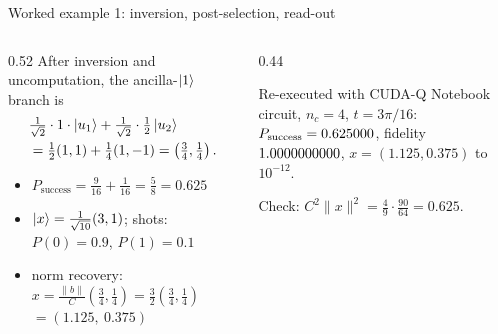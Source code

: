 \documentclass[aspectratio=169,11pt]{beamer}
\begin{document}
\begin{frame}{Worked example 1: inversion, post-selection, read-out}
  \begin{columns}[T]
    \begin{column}{0.52\textwidth}
      \small After inversion and uncomputation, the ancilla-$\ket1$ branch is
      \begin{align*}
        &\tfrac{1}{\sqrt2}\cdot1\cdot\ket{u_1} + \tfrac{1}{\sqrt2}\cdot\tfrac12\ket{u_2}\\
        &= \tfrac12(1, 1) + \tfrac14(1, -1) = \left(\tfrac34, \tfrac14\right).
      \end{align*}
      \begin{itemize}
        \item $P_{\text{success}} = \frac9{16} + \frac1{16} = \frac58 = 0.625$
        \item $\ket x = \frac{1}{\sqrt{10}}(3, 1)$; shots: $P(0) = 0.9$, $P(1) = 0.1$
        \item norm recovery: $x = \frac{\|b\|}{C}\left(\tfrac34, \tfrac14\right) = \tfrac32\left(\tfrac34, \tfrac14\right)$\\ $= (1.125,\ 0.375)$ \checkmark
      \end{itemize}
    \end{column}
    \begin{column}{0.44\textwidth}
      \begin{exampleblock}{Re-executed with CUDA-Q}
        Notebook circuit, $n_c = 4$, $t = 3\pi/16$:\\
        $P_{\text{success}} = 0.625000$, fidelity $1.0000000000$, $x = (1.125, 0.375)$ to $10^{-12}$.
      \end{exampleblock}
      \small Check: $C^2\|x\|^2 = \frac49\cdot\frac{90}{64} = 0.625$.
    \end{column}
  \end{columns}
\end{frame}
\end{document}

